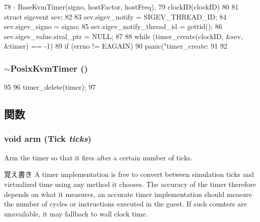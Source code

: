 \begin{DoxyCode}
78     : BaseKvmTimer(signo, hostFactor, hostFreq),
79       clockID(clockID)
80 {
81     struct sigevent sev;
82 
83     sev.sigev_notify = SIGEV_THREAD_ID;
84     sev.sigev_signo = signo;
85     sev.sigev_notify_thread_id = gettid();
86     sev.sigev_value.sival_ptr = NULL;
87 
88     while (timer_create(clockID, &sev, &timer) == -1) {
89         if (errno != EAGAIN)
90             panic("timer_create: %
91     }
92 }
\end{DoxyCode}
\hypertarget{classPosixKvmTimer_a83d2c8118d7b82a9bbd040e05626d705}{
\subsubsection[{$\sim$PosixKvmTimer}]{\setlength{\rightskip}{0pt plus 5cm}$\sim${\bf PosixKvmTimer} ()}}
\label{classPosixKvmTimer_a83d2c8118d7b82a9bbd040e05626d705}



\begin{DoxyCode}
95 {
96     timer_delete(timer);
97 }
\end{DoxyCode}


\subsection{関数}
\hypertarget{classPosixKvmTimer_a5041ff590d50fcb1f0f5149b2e7eb4bb}{
\subsubsection[{arm}]{\setlength{\rightskip}{0pt plus 5cm}void arm ({\bf Tick} {\em ticks})}}
\label{classPosixKvmTimer_a5041ff590d50fcb1f0f5149b2e7eb4bb}
Arm the timer so that it fires after a certain number of ticks.

\begin{DoxyNote}{覚え書き}
A timer implementation is free to convert between simulation ticks and virtualized time using any method it chooses. The accuracy of the timer therefore depends on what it measures, an accurate timer implementation should measure the number of cycles or instructions executed in the guest. If such counters are unavailable, it may fallback to wall clock time.
\end{DoxyNote}

